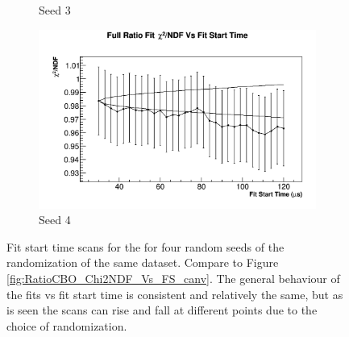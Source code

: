 \begin{figure}[]
\begin{subfigure}[t]{0.45\textwidth}
			    \caption{Seed 3}
		    \end{subfigure}
		    \begin{subfigure}[t]{0.45\textwidth}
			    \centering
				\includegraphics[width=\textwidth]{RatioCBO_Chi2NDF_Vs_FS_canv-Seed18}
			    \caption{Seed 4}
		    \end{subfigure}%
		\caption[RandomSeedFitStartScansChi2]{Fit start time scans for the \chisq for four random seeds of the randomization of the same dataset. Compare to Figure \ref{fig:RatioCBO_Chi2NDF_Vs_FS_canv}. The general behaviour of the fits vs fit start time is consistent and relatively the same, but as is seen the scans can rise and fall at different points due to the choice of randomization.}
		\label{fig:RandomSeedFitStartScansChi2}
		\end{figure}

